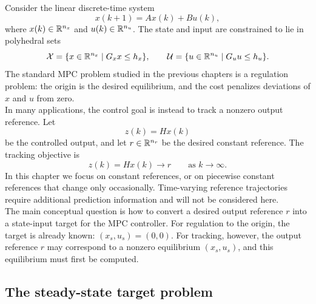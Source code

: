 Consider the linear discrete-time system
\[
    x(k+1) = Ax(k) + Bu(k),
\]
where \(x(k) \in \mathbb{R}^{n_x}\) and \(u(k) \in \mathbb{R}^{n_u}\). The state and input are constrained to lie in
polyhedral sets
\[
    \mathcal{X} = \{x \in \mathbb{R}^{n_x} \mid G_x x \le h_x\}, \qquad
    \mathcal{U} = \{u \in \mathbb{R}^{n_u} \mid G_u u \le h_u\}.
\]
The standard MPC problem studied in the previous chapters is a regulation problem: the origin
is the desired equilibrium, and the cost penalizes deviations of \(x\) and \(u\) from zero.\\
In many applications, the control goal is instead to track a nonzero output reference. Let
\[
    z(k) = Hx(k)
\]
be the controlled output, and let \(r \in \mathbb{R}^{n_r}\) be the desired constant reference. The tracking
objective is
\[
    z(k) = Hx(k) \longrightarrow r
    \qquad \text{as } k \to \infty .
\]
In this chapter we focus on constant references, or on piecewise constant references that change
only occasionally. Time-varying reference trajectories require additional prediction information
and will not be considered here.\\
The main conceptual question is how to convert a desired output reference \(r\) into a state-input
target for the MPC controller. For regulation to the origin, the target is already known:
\((x_s,u_s)=(0,0)\). For tracking, however, the output reference \(r\) may correspond to a
nonzero equilibrium \((x_s,u_s)\), and this equilibrium must first be computed.

\subsection{The steady-state target problem}

